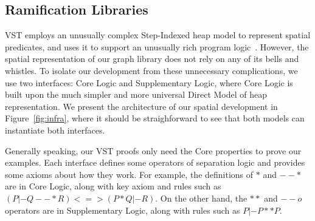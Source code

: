 \subsection{Ramification Libraries}\label{sec:ramifylib}



VST employs an unusually complex Step-Indexed heap model to represent
spatial predicates, and uses it to support an unusually rich program
logic~\cite{appel:programlogics}. However, the spatial representation
of our graph library does not rely on any of its bells and whistles.
To isolate our development from these unnecessary complications,
we use two interfaces: Core Logic and Supplementary
Logic, where Core Logic is built upon the much simpler
and more universal Direct Model of heap representation.
We present the architecture of our spatial development in
Figure~\ref{fig:infra}, where it should be straighforward to see
that both models can instantiate both interfaces.

Generally speaking, our VST proofs only need the Core properties to prove
our examples. Each interface defines some operators of separation logic and
provides some axioms about how they work.  For example, the definitions of $*$ and
$--*$ are in Core Logic, along with key axiom and rules such as
$(P |- Q --* R) <=> (P * Q |- R)$.  On the other hand,
the $**$ and $--o$ operators are in Supplementary Logic,
along with rules such as $P |- P ** P$.



